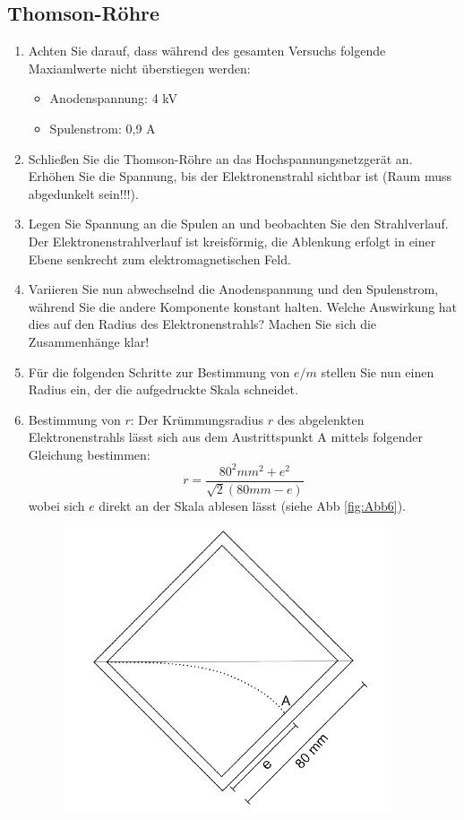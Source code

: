 \subsection{Thomson-Röhre}
\begin{enumerate}
	\item Achten Sie darauf, dass während des gesamten Versuchs folgende Maxiamlwerte nicht überstiegen werden:
	\begin{itemize}
		\item Anodenspannung: 4 kV
		\item Spulenstrom: 0,9 A
	\end{itemize}
	\item Schließen Sie die Thomson-Röhre an das Hochspannungsnetzgerät an. Erhöhen Sie die Spannung, bis der Elektronenstrahl sichtbar ist (Raum muss abgedunkelt sein!!!).
	\item Legen Sie Spannung an die Spulen an und beobachten Sie den Strahlverlauf. Der Elektronenstrahlverlauf ist kreisförmig, die Ablenkung erfolgt in einer Ebene senkrecht zum elektromagnetischen Feld.
	\item Variieren Sie nun abwechselnd die Anodenspannung und den Spulenstrom, während Sie die andere Komponente konstant halten. Welche Auswirkung hat dies auf den Radius des Elektronenstrahls? Machen Sie sich die Zusammenhänge klar!
	\item Für die folgenden Schritte zur Bestimmung von $e/m$ stellen Sie nun einen Radius ein, der die aufgedruckte Skala schneidet.
	\item Bestimmung von $r$: Der Krümmungsradius $r$ des abgelenkten Elektronenstrahls lässt sich aus dem Austrittspunkt A mittels folgender Gleichung bestimmen:
	\begin{equation}
		r=\frac{80^2mm^2+e^2}{\sqrt{2}(80mm-e)}
	\end{equation}
	wobei sich $e$ direkt an der Skala ablesen lässt (siehe Abb \ref{fig:Abb6}).
	\begin{figure}[!h]
		\centering
		\includegraphics{emskizze}

\end{figure}
\end{enumerate}
